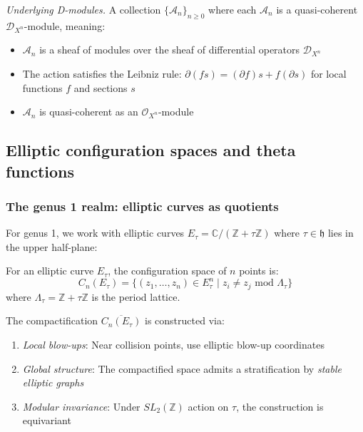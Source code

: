 \emph{Underlying D-modules.} A collection $\{\mathcal{A}_n\}_{n \geq 0}$ where each $\mathcal{A}_n$ is a quasi-coherent $\mathcal{D}_{X^n}$-module, meaning:
\begin{itemize}
\item $\mathcal{A}_n$ is a sheaf of modules over the sheaf of differential operators $\mathcal{D}_{X^n}$
\item The action satisfies the Leibniz rule: $\partial(fs) = (\partial f)s + f(\partial s)$ for local functions $f$ and sections $s$
\item $\mathcal{A}_n$ is quasi-coherent as an $\mathcal{O}_{X^n}$-module
\end{itemize}

\subsection{Elliptic configuration spaces and theta functions}

\subsubsection{The genus 1 realm: elliptic curves as quotients}

For genus 1, we work with elliptic curves $E_\tau = \mathbb{C}/(\mathbb{Z} + \tau\mathbb{Z})$ where $\tau \in \mathfrak{h}$ lies in the upper half-plane:

\begin{definition}
For an elliptic curve $E_\tau$, the configuration space of $n$ points is:
\[
C_n(E_\tau) = \{(z_1, \ldots, z_n) \in E_\tau^n \mid z_i \neq z_j \text{ mod } \Lambda_\tau\}
\]
where $\Lambda_\tau = \mathbb{Z} + \tau\mathbb{Z}$ is the period lattice.
\end{definition}

\begin{theorem}
\label{thm:elliptic-compactification}
The compactification $\overline{C_n(E_\tau)}$ is constructed via:
\begin{enumerate}
\item \emph{Local blow-ups}: Near collision points, use elliptic blow-up coordinates
\item \emph{Global structure}: The compactified space admits a stratification by \emph{stable elliptic graphs}
\item \emph{Modular invariance}: Under $SL_2(\mathbb{Z})$ action on $\tau$, the construction is equivariant
\end{enumerate}
\end{theorem}

